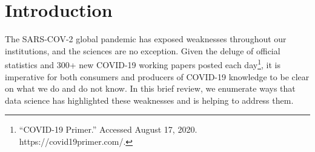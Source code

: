 \documentclass[10pt,letterpaper]{article}
\newcommand{\getIndex}[2]{
  \ForEach{,}{\IfEq{#1}{\thislevelitem}{\number\thislevelcount\ExitForEach}{}}{#2}
}
\newcommand{\getAff}[1]{
  \getIndex{#1}{University of California San Diego}
}
\begin{document}
\vspace*{0.2in}



\linenumbers

\section{Introduction}\label{introduction}

The SARS-COV-2 global pandemic has exposed weaknesses throughout our
institutions, and the sciences are no exception. Given the deluge of
official statistics and 300+ new COVID-19 working papers posted each
day\footnote{``COVID-19 Primer.'' Accessed August 17, 2020.
  https://covid19primer.com/.}, it is imperative for both consumers and
producers of COVID-19 knowledge to be clear on what we do and do not
know. In this brief review, we enumerate ways that data science has
highlighted these weaknesses and is helping to address them.
\end{document}
